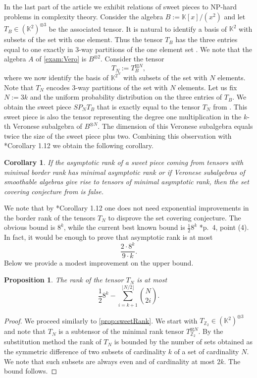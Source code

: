 \documentclass[a4paper,11pt,reqno]{amsart}
\newcommand{\bbK}{\mathbb{K}}
\newcommand{\bbZ}{\mathbb{Z}}
\numberwithin{equation}{section}
\theoremstyle{definition}
\theoremstyle{plain}
\newtheorem{prop}[defn]{Proposition}
\newtheorem{cor}[defn]{Corollary}
\theoremstyle{remark}
\begin{document}
In the last part of the article we exhibit relations of sweet pieces to NP-hard problems in complexity theory.
Consider the algebra $B:=\bbK[x]/(x^2)$ and let $T_B\in (\bbK^2)^{\otimes 3}$ be the associated tensor. It is natural to identify a basis of $\bbK^2$ with subsets of the set with one element.
Thus the tensor $T_B$ has the three entries equal to one exactly in $3$-way partitions of the one element set \cite{bjorklund2023asymptotic}.
We note that the algebra $A$ of \autoref{exam:Vero} is $B^{\otimes 2}$.
Consider the tensor \[T_N:=T_B^{\boxtimes N},\] where we now identify the basis of $\bbK^{2^N}$ with subsets of the set with $N$ elements. Note that $T_N$ encodes $3$-way partitions of the
set with $N$ elements.
Let us fix $N:=3k$ and the uniform probability distribution on the three entries of $T_B$. We obtain the sweet piece $SP_N{T_B}$ that is exactly equal to the tensor $T_N$ from \cite{pratt2023stronger}.
This sweet piece is also the tensor representing the degree one multiplication in the $k$-th Veronese subalgebra of $B^{\otimes N}$. The dimension of this Veronese subalgebra equals twice
the size of the sweet piece plus two. Combining this observation with \cite{pratt2023stronger}*{Corollary 1.12} we obtain the following corollary.
\begin{cor}
If the asymptotic rank of a sweet piece coming from tensors with minimal border rank has minimal asymptotic rank or if Veronese subalgebras of smoothable algebras give rise to tensors of minimal
asymptotic rank, then the set covering conjecture from \cite{cygan2016problems} is false.
\end{cor}
We note that by \cite{pratt2023stronger}*{Corollary 1.12} one does not need exponential improvements in the border rank of the tensors $T_N$ to disprove the set covering conjecture. The obvious bound
is $8^k$, while the current best known bound is $\frac{1}{2}8^k$ \cite{pratt2023stronger}*{p.~4, point (4)}. In fact, it would be enough to prove that asymptotic rank is at most
\[\frac{2\cdot 8^k}{9\cdot k}.\] Below we provide a modest improvement on the upper bound.
\begin{prop}\label{prop:Prattimproved}
The rank of the tensor $T_N$ is at most \[\frac{1}{2}8^{k}-\sum_{i=k+1}^{\lfloor N/2\rfloor} \binom{N}{2i}.\]
\end{prop}
\begin{proof}
We proceed similarly to \autoref{prop:sweetRank}. We start with $T_{\bbZ_2}\in
(\bbK^2)^{\otimes 3}$ and note that $T_N$ is a subtensor of the minimal rank tensor $T_{\bbZ_2}^{\boxtimes N}$.
By the substitution method the rank of $T_N$ is bounded by the number of sets obtained as the symmetric difference of two subsets of cardinality $k$ of a set of cardinality $N$.
We note that such subsets are always even and of cardinality at most $2k$. The bound follows.
\end{proof}
\end{document}
